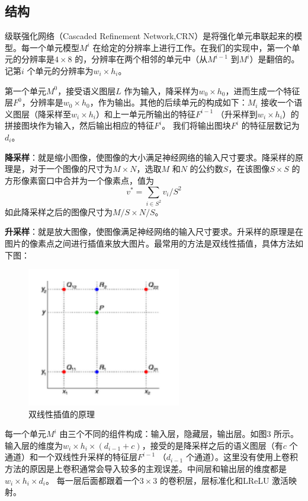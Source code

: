 \documentclass{ctexart}
\begin{document}
        \subsection{结构}
            级联强化网络（Cascaded Refinement Network,CRN）是将强化单元串联起来的模型。每一个单元模型$M^i$ 在给定的分辨率上进行工作。在我们的实现中，第一个单元的分辨率是$4\times 8$ 的，分辨率在两个相邻的单元中（从$M^{i-1}$ 到$M^i$）是翻倍的。记第$i$ 个单元的分辨率为$w_i \times h_i$。

            第一个单元$M^0$，接受语义图层$L$ 作为输入，降采样为$w_0 \times h_0$，进而生成一个特征层$F^0$，分辨率是$w_0 \times h_0$，作为输出。其他的后续单元的构成如下：$M_i$ 接收一个语义图层（降采样至$w_i \times h_i$）和上一单元所输出的特征$F^{i-1}$ （升采样到$w_i \times h_i$）的拼接图块作为输入，然后输出相应的特征$F^i$。 我们将输出图块$F^i$ 的特征层数记为$d_i$。

            \textbf{降采样}：就是缩小图像，使图像的大小满足神经网络的输入尺寸要求。降采样的原理是，对于一个图像的尺寸为$M\times N$，选取$M$ 和$N$ 的公约数$S$，在该图像$S\times S$ 的方形像素窗口中合并为一个像素点，值为
            $$
                v^* = \sum_{i \in S^2} v_i/S^2
            $$
            如此降采样之后的图像尺寸为$M/S\times N/S$。

            \textbf{升采样}：就是放大图像，使图像满足神经网络的输入尺寸要求。升采样的原理是在图片的像素点之间进行插值来放大图片。最常用的方法是双线性插值，具体方法如下图：
            \begin{figure}[h]
                \centering
                \includegraphics[width=0.6\textwidth]{1}
                \caption{双线性插值的原理}
                \label{f_1}
            \end{figure}

            每一个单元$M^i$ 由三个不同的组件构成：输入层，隐藏层，输出层。如图3 所示。输入层的维度为$w_i \times h_i \times (d_{i-1} + c)$，接受的是降采样之后的语义图层（有$c$ 个通道）和一个双线性升采样的特征层$F^{i-1}$ （$d_{i-1}$ 个通道）。这里没有使用上卷积方法的原因是上卷积通常会导入较多的主观误差。中间层和输出层的维度都是$w_i\times h_i \times d_i$。 每一层后面都跟着一个$3\times 3$ 的卷积层，层标准化和LReLU 激活映射。
\end{document}
